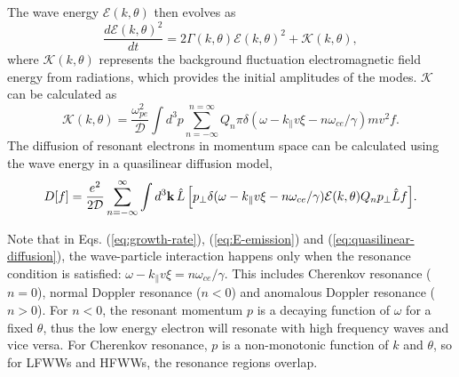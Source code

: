 \documentclass[aps, prl, preprint,english,superscriptaddress]{revtex4-1}
\begin{document}
The wave energy $\mathcal{E}(k,\theta)$ then evolves as
\begin{equation}
\label{eq:E-evolution}
\frac{d \mathcal{E}(k,\theta)^{2}}{d t}=2\Gamma(k,\theta) \mathcal{E}(k,\theta)^{2}+\mathcal{K}(k,\theta),
\end{equation}
where $\mathcal{K}(k,\theta)$ represents the background fluctuation electromagnetic field energy from radiations, which provides the initial amplitudes of the modes\cite{harvey_electron_1993}. $\mathcal{K}$ can be calculated as
\begin{equation}
\label{eq:E-emission}
\mathcal{K}(k,\theta)  = \frac{{\omega _{pe}^2}}{\mathcal{D}}\int {{d^3}p\mathop \sum \limits_{n =  - \infty }^{n = \infty } {Q_n}\pi \delta (\omega  - {k_\parallel }v\xi  - n{\omega _{ce}}/\gamma ) mv^{2} f}.
\end{equation}
The diffusion of resonant electrons in momentum space can be calculated using the wave energy in a quasilinear diffusion model\cite{kaufman_quasilinear_1972},
\begin{equation}
\label{eq:quasilinear-diffusion}
D[f] = \frac{e^2}{2\mathcal{D}}\sum\limits_{n =  - \infty }^\infty  {\int {{d^3}{\bf{k}}\,\hat L \left[{p_ \bot }\delta (\omega  - {k_\parallel }{v \xi } - n\omega_{ce}/\gamma )\mathcal{E}(k,\theta){Q_n}{p_ \bot }\hat L {f }\right]} }.
\end{equation}

Note that in Eqs. (\ref{eq:growth-rate}), (\ref{eq:E-emission}) and (\ref{eq:quasilinear-diffusion}), the wave-particle interaction happens only when the resonance condition is satisfied: $\omega-k_{\parallel} v\xi=n\omega_{ce}/\gamma$. This includes Cherenkov resonance ($n=0$), normal Doppler resonance ($n<0$) and anomalous Doppler resonance ($n>0$).
For $n<0$, the resonant momentum $p$ is a decaying function of  $\omega$ for a fixed $\theta$, thus the low energy electron will resonate with high frequency waves and vice versa. For Cherenkov resonance, $p$ is a non-monotonic function of $k$ and $\theta$, so for LFWWs and HFWWs, the resonance regions overlap.

\end{document}
